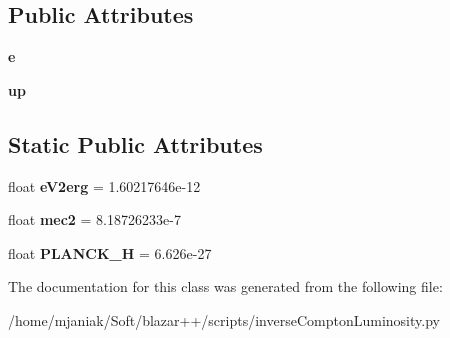 \subsection*{Public Attributes}
\begin{DoxyCompactItemize}
\item 
\hypertarget{classinverseComptonLuminosity_1_1external_a7497ffddb9bb14547cdfd558a0e1dce2}{{\bfseries e}}\label{classinverseComptonLuminosity_1_1external_a7497ffddb9bb14547cdfd558a0e1dce2}

\item 
\hypertarget{classinverseComptonLuminosity_1_1external_a6741a43aae61330de511389e34e2f4f6}{{\bfseries up}}\label{classinverseComptonLuminosity_1_1external_a6741a43aae61330de511389e34e2f4f6}

\end{DoxyCompactItemize}
\subsection*{Static Public Attributes}
\begin{DoxyCompactItemize}
\item 
\hypertarget{classinverseComptonLuminosity_1_1external_a30284c3d883b7cc00f9c7b12d779a179}{float {\bfseries e\-V2erg} = 1.\-60217646e-\/12}\label{classinverseComptonLuminosity_1_1external_a30284c3d883b7cc00f9c7b12d779a179}

\item 
\hypertarget{classinverseComptonLuminosity_1_1external_a5ebdb1cbbdfeef88d577bcdd64c0cde0}{float {\bfseries mec2} = 8.\-18726233e-\/7}\label{classinverseComptonLuminosity_1_1external_a5ebdb1cbbdfeef88d577bcdd64c0cde0}

\item 
\hypertarget{classinverseComptonLuminosity_1_1external_ab0891fb601413ccb10e473f5efe0a50c}{float {\bfseries P\-L\-A\-N\-C\-K\-\_\-\-H} = 6.\-626e-\/27}\label{classinverseComptonLuminosity_1_1external_ab0891fb601413ccb10e473f5efe0a50c}

\end{DoxyCompactItemize}


The documentation for this class was generated from the following file\-:\begin{DoxyCompactItemize}
\item 
/home/mjaniak/\-Soft/blazar++/scripts/inverse\-Compton\-Luminosity.\-py\end{DoxyCompactItemize}

